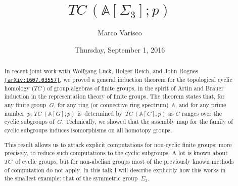 \documentclass{UAmathtalk}
\author{Marco Varisco}
\title{\(\mathit{TC\,}(\mathbb{A}[\Sigma_3];p)\)}
\date{Thursday, September 1, 2016}
\begin{document}
\maketitle

\begin{abstract}
In recent joint work with Wolfgang Lück, Holger Reich, and John Rognes
\href{http://www.arxiv.org/abs/1607.03557/}{\texttt{[arXiv:1607.03557]}},
we proved a general induction theorem for the topological cyclic homology ($\mathit{TC\,}$) of group algebras of finite groups, in the spirit of Artin and Brauer induction in the representation theory of finite groups.
The theorem states that, for any finite group~$G$, for any ring (or connective ring spectrum)~$\mathbb{A}$, and for any prime number~$p$, $\mathit{TC\,}(\mathbb{A}[G];p)$ is~determined by~$\mathit{TC\,}(\mathbb{A}[C];p)$ as $C$ ranges over the cyclic subgroups of~$G$.
Technically, we showed that the assembly map for the family of cyclic subgroups induces isomorphisms on all homotopy groups.

This result allows us to attack explicit computations for non-cyclic finite groups; more precisely, to reduce such computations to the cyclic subgroups.
A lot is known about~$\mathit{TC\,}$ of cyclic groups, but for non-abelian groups most of the previously known methods of computation do not apply.
In this talk I will describe explicitly how this works in the smallest example: that of the symmetric group~$\Sigma_3$.
\end{abstract}
\end{document}
